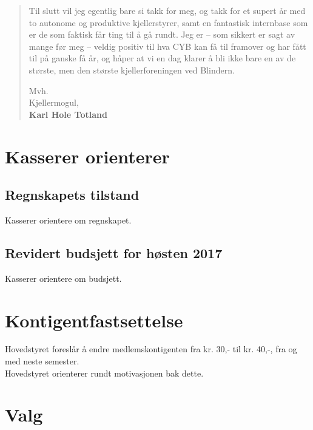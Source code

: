 \documentclass[10pt,norsk,a4paper]{article}
\begin{document}
\begin{quote}
Til slutt vil jeg egentlig bare si takk for meg, og takk for et supert år med to autonome og produktive kjellerstyrer, samt en fantastisk internbase som er de som faktisk får ting til å gå rundt. Jeg er – som sikkert er sagt av mange før meg – veldig positiv til hva CYB kan få til framover og har fått til på ganske få år, og håper at vi en dag klarer å bli ikke bare en av de største, men den største kjellerforeningen ved Blindern.

Mvh.\\
Kjellermogul,\\
\textbf{Karl Hole Totland}

\end{quote}


\section{Kasserer orienterer}
\subsection{Regnskapets tilstand}
Kasserer orientere om regnskapet.


\subsection{Revidert budsjett for høsten 2017}
Kasserer orientere om budsjett.



\section{Kontigentfastsettelse}
Hovedstyret foreslår å endre medlemskontigenten fra kr. 30,- til kr. 40,-,
fra og med neste semester. \\
Hovedstyret orienterer rundt motivasjonen bak dette.


\section{Valg}
\end{document}
